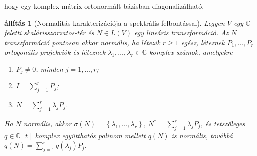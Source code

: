 \documentclass[9pt, a4paper, showtrims]{memoir}
\theoremstyle{plain}
\newtheorem{proposition}{állítás}[chapter]
\theoremstyle{remark}
\theoremstyle{definition}
\begin{document}
hogy egy komplex mátrix ortonormált bázisban diagonalizálható.
\begin{proposition}[Normalitás karakterizációja a spektrális felbontással]
    Legyen $V$ egy $\mathbb{C}$ feletti skalárisszorzatos-tér és $N\in L\left( V \right)$ egy lineáris transzformáció.
    Az $N$ transzformáció pontosan akkor normális,
    ha létezik $r\geq 1$ egész, léteznek $P_1,\dots,P_r$ ortogonális projekciók és
    léteznek $\lambda_1,\dots,\lambda_r\in\mathbb{C}$ komplex számok,
    amelyekre
    \begin{enumerate}
        \item $P_j\neq 0$, minden $j=1,\dots,r$;
        \item $I=\sum_{j=1}^rP_j$;
        \item $N=\sum_{j=1}^r\lambda_jP_j$.
    \end{enumerate}
    Ha $N$ normális, 
    akkor $\sigma\left( N \right)=\left\{ \lambda_1,\dots,\lambda_r \right\}$,
    $N^\ast=\sum_{j=1}^r\overline{\lambda_j}P_j$, 
    és tetszőleges $q\in\mathbb{C}[t]$ komplex együtthatós polinom mellett
    $q\left( N \right)$ is normális, 
    továbbá
    $q\left( N \right)=\sum_{j=1}^rq\left( \lambda_j \right)P_j$.
\end{proposition}
\end{document}
